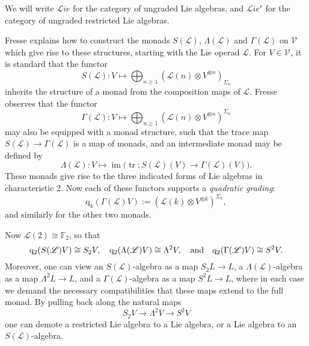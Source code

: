 \documentclass[11pt]{amsart} \renewcommand{\baselinestretch}{1.4}
\theoremstyle{plain}
\theoremstyle{definition}
\DeclareMathOperator{\im}{im}
\DeclareMathOperator{\trace}{tr}
\renewcommand{\to}{\longrightarrow}
\newcommand{\scrL}{\mathscr{L}}
\newcommand{\calV}{\mathcal{V}}
\newcommand{\LieOperad}{{\scrL}}
\newcommand{\vect}[2]{\calV^{#1}_{#2}}
\newcommand{\quadgrad}[1]{\mathrm{q}_{#1}}
\newcommand{\F}{\mathbb{F}}
\newcommand{\liealgs}{{\scrL\!\textit{ie}}}
\newcommand{\restliealgs}{{\scrL\!\textit{ie}^\textit{r}}}
\newcommand{\Ftwo}{\F_2}
\renewcommand{\mapsto}{\longmapsto}
\begin{document}
\begin{Conventions and notation}
We will  write $\liealgs$ for the category of ungraded Lie algebras, and $\restliealgs$ for the category of ungraded restricted Lie algebras.

Fresse \cite{FresseSimplicialAlgs.pdf} explains how to construct the monads $S(\LieOperad)$, $\Lambda(\LieOperad)$ and $\Gamma(\LieOperad)$ on $\vect{}{}$ which give rise to these structures, starting with the Lie operad $\LieOperad$. For $V\in\vect{}{}$, it is standard that the functor
\[S(\LieOperad):V\mapsto \bigoplus_{n\geq1}(\LieOperad(n)\otimes V^{\otimes n})_{\Sigma_n}\]
inherits the structure of a monad from the composition maps of $\LieOperad$. Fresse observes that the functor
\[\Gamma(\LieOperad):V\mapsto \bigoplus_{n\geq1}(\LieOperad(n)\otimes V^{\otimes n})^{\Sigma_n}\]
may also be equipped with a monad structure, such that the trace map $S(\LieOperad)\to \Gamma(\LieOperad)$
is a map of monads, and an intermediate monad may be defined by
\[\Lambda(\LieOperad):V\mapsto\im\bigl(\trace:S(\LieOperad)(V)\to \Gamma(\LieOperad)(V)\bigr).\]
These monads give rise to the three indicated forms of Lie algebras in characteristic 2. Now each of these functors supports a \emph{quadratic grading}:
\[\quadgrad{k}(\Gamma(\LieOperad)V):=(\LieOperad(k)\otimes V^{\otimes k})^{\Sigma_k},\]
and similarly for the other two monads.

 Now $\LieOperad(2)\cong\Ftwo $, so that
\[\quadgrad{2}(S(\LieOperad)V)\cong S_2V,\quad \quadgrad{2}(\Lambda(\LieOperad)V)\cong \Lambda^2V,\quad\textup{and}\quad\quadgrad{2}(\Gamma(\LieOperad)V)\cong S^2V.\]
Moreover, one can view an $S(\LieOperad)$-algebra as a map $S_2L\to L$, a $\Lambda(\LieOperad)$-algebra as a map $\Lambda^2L\to L$, and a $\Gamma(\LieOperad)$-algebra as a map $S^2L\to L$, where in each case we demand the necessary compatibilities that these maps extend to the full monad. %
By pulling back along the natural maps
\[S_2V\to \Lambda^2 V\to S^2V\]
one can demote a restricted Lie algebra to a Lie algebra, or a Lie algebra to an $S(\LieOperad)$-algebra.


\end{Conventions and notation}
\end{document}
